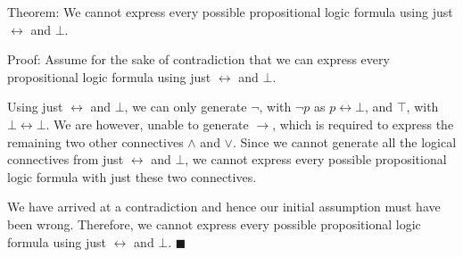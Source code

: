 \documentclass{article}
\renewcommand{\(}{\left(}
\renewcommand{\)}{\right)}
\theoremstyle{plain}
\theoremstyle{plain}
\theoremstyle{definition}
\begin{document}
\begin{shaded}
            Theorem: We cannot express every possible propositional logic formula using just $\leftrightarrow$ and $\bot$.

            \vspace{4mm}

            Proof: Assume for the sake of contradiction that we can express every propositional logic formula using just $\leftrightarrow$ and $\bot$.

            \vspace{4mm}

            Using just $\leftrightarrow$ and $\bot$, we can only generate $\neg$, with $\neg p$ as $p\leftrightarrow\bot$, and $\top$, with $\bot\leftrightarrow\bot$. We are however, unable to generate $\to$, which is required to express the remaining two other connectives $\wedge$ and $\vee$. Since we cannot generate all the logical connectives from just $\leftrightarrow$ and $\bot$, we cannot express every possible propositional logic formula with just these two connectives.

            \vspace{4mm}

           We have arrived at a contradiction and hence our initial assumption must have been wrong. Therefore, we cannot express every possible propositional logic formula using just $\leftrightarrow$ and $\bot$. $\blacksquare$
        \end{shaded}
\end{document}
